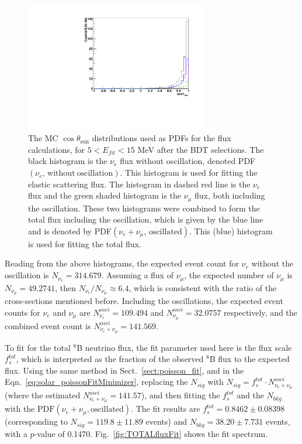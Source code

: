 {\begin{figure}[!htb]
	\centering
	\includegraphics[width=8cm]{MCfluxPdfs.pdf}
	\caption[The MC $\cos\theta_\mathrm{sun}$ distributions used as PDFs for the flux calculations after the BDT selections ($5<E_{fit}<15$ MeV).]{The MC $\cos\theta_\mathrm{sun}$ distributions used as PDFs for the flux calculations, for $5<E_{fit}<15$ MeV after the BDT selections. The black histogram is the $\nu_e$ flux without oscillation, denoted PDF$(\nu_e, \, \mathrm{without~oscillation})$. This histogram is used for fitting the elastic scattering flux. The histogram in dashed red line is the $\nu_e$ flux and the green shaded histogram is the $\nu_\mu$ flux, both including the oscillation. These two histograms were combined to form the total flux including the oscillation, which is given by the blue line and is denoted by PDF$(\nu_e+\nu_\mu, \, \mathrm{oscillated})$. This (blue) histogram is used for fitting the total flux.\label{fig:MCfluxPdfs}}
\end{figure} 

Reading from the above histograms, the expected event count for $\nu_e$ without the oscillation is $N_{\nu_e} = 314.679$. Assuming a flux of $\nu_\mu$, the expected number of $\nu_\mu$ is $N_{\nu_\mu}=49.2741$, then $N_{\nu_e}/N_{\nu_\mu}\approx 6.4$, which is consistent with the ratio of the cross-sections mentioned before. Including the oscillations, the expected event counts for $\nu_e$ and $\nu_\mu$ are $N^{osci}_{\nu_e} = 109.494$ and $N^{osci}_{\nu_\mu} = 32.0757$ respectively, and the combined event count is $N^{osci}_{\nu_e+\nu_\mu}=141.569$. %
 
To fit for the total $^8$B neutrino flux, the fit parameter used here is the flux scale $f^{tot}_s$, which is interpreted as the fraction of the observed $^8$B flux to the expected flux. Using the same method in Sect.~\ref{sect:poisson_fit}, and in the Eqn.~\ref{eq:solar_poissonFitMinimizer}, replacing the $N_{sig}$ with $N_{sig}=f^{tot}_s\cdot N^{osci}_{\nu_e+\nu_\mu}$(where the estimated $N^{osci}_{\nu_e+\nu_\mu}=141.57$), and then fitting the $f^{tot}_s$ and the $N_{bkg}$ with the $\mathrm{PDF}(\nu_e+\nu_\mu,\mathrm{oscillated})$. The fit results are $f^{tot}_s=0.8462\pm 0.08398$ (corresponding to $N_{sig}=119.8\pm11.89$ events) and $N_{bkg}=38.20\pm7.731$ events, with a $p$-value of 0.1470. Fig.~\ref{fig:TOTALfluxFit} shows the fit spectrum.

}
